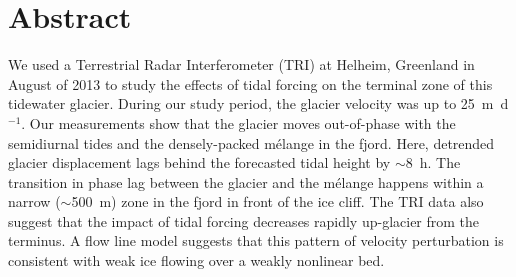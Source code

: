 

% 
% 

\section{Abstract} We used a Terrestrial Radar Interferometer (TRI) at Helheim, Greenland in August of 2013 to study the effects of tidal forcing on the terminal zone of this tidewater glacier. During our study period, the glacier velocity was up to 25~m~d$^{-1}$. Our measurements show that the glacier moves out-of-phase with the semidiurnal tides and the densely-packed m\'elange in the fjord. Here, detrended glacier displacement lags behind the forecasted tidal height by $\sim$8~h. The transition in phase lag between the glacier and the m\'elange happens within a narrow ($\sim$500~m) zone in the fjord in front of the ice cliff. The TRI data also suggest that the impact of tidal forcing decreases rapidly up-glacier from the terminus. A flow line model suggests that this pattern of velocity perturbation is consistent with weak ice flowing over a weakly nonlinear bed.



